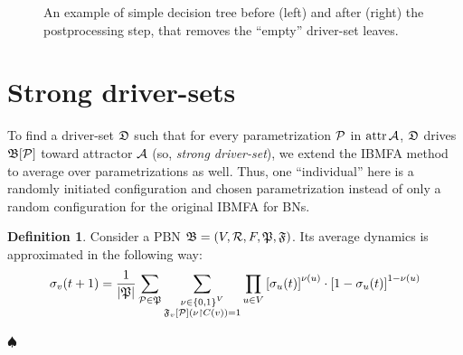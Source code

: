 \documentclass[
	digital, oneside, nosansbold, nocolorbold, nolot, nolof
]{fithesis4}
\theoremstyle{definition}
\newtheorem{definition}{Definition}
\theoremstyle{definition}
\newenvironment{ldefinition}
    {\begin{definition}}
	{\par\hspace{\stretch{1}}$\spadesuit$\hspace{\stretch{1}}
     \par\end{definition}}
\DeclareMathOperator{\attrf}{attr}
\DeclarePairedDelimiter{\set}{\{}{\}}
\begin{document}
\begin{figure}[!ht]
\centering
{}
\quad
\quad
{}
\caption{An example of simple decision tree before (left) and after (right) the
    postprocessing step, that removes the \enquote{empty} driver-set leaves.}
\label{fig:dt_post}
\end{figure}

\section{Strong driver-sets}

To find a driver-set $\mathfrak{D}$ such that for every parametrization $\mathcal{P}$
in $\attrf{\attr{A}}$, $\mathfrak{D}$ drives $\mathfrak{B}[\mathcal{P}]$ toward attractor
$\mathcal{A}$ (so, \emph{strong driver-set}), we extend the IBMFA method to
average over parametrizations as well. Thus, one \enquote{individual} here is a
randomly initiated configuration and chosen parametrization instead of only a
random configuration for the original IBMFA for BNs.

\begin{ldefinition}
Consider a PBN $\mathfrak{B} = (V, \mathcal{R}, F, \mathfrak{P}, \mathfrak{F})$.
Its average dynamics is approximated in the following way:
\begin{equation}
    \sigma_v(t + 1)
    = \frac{1}{|\paronset{P}|} \sum_{\paron{P} \in \paronset{P}}
        \sum_{\substack{\nu \in \set{0, 1}^V \\
                \PBNUFs{F}_v[\paron{P}](\nu\restriction C(v)) = 1}} 
            \prod_{u \in V}
                \left[ \sigma_u(t) \right]^{\nu(u)}
                \cdot \left[ 1 - \sigma_u(t) \right]^{1 - \nu(u)}
    \label{eq:pbn_ibmfa}
\end{equation}
\end{ldefinition}
\end{document}
